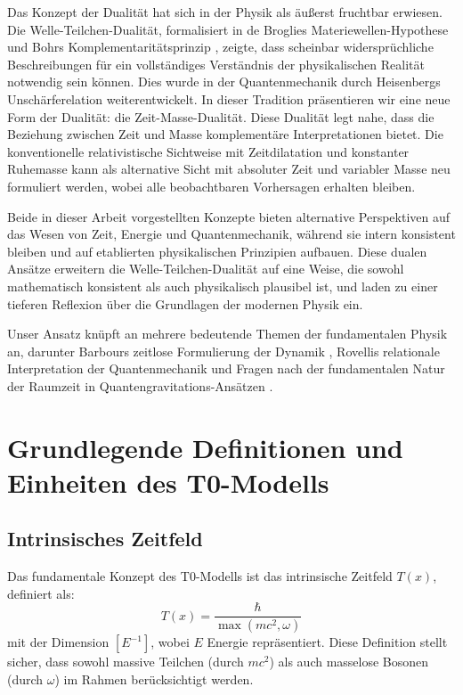 \documentclass[a4paper,12pt]{article}
\newcommand{\Tfield}{T(x)}
\begin{document}
	Das Konzept der Dualität hat sich in der Physik als äußerst fruchtbar erwiesen. Die Welle-Teilchen-Dualität, formalisiert in de Broglies Materiewellen-Hypothese \cite{deBroglie1923} und Bohrs Komplementaritätsprinzip \cite{Bohr1928}, zeigte, dass scheinbar widersprüchliche Beschreibungen für ein vollständiges Verständnis der physikalischen Realität notwendig sein können. Dies wurde in der Quantenmechanik durch Heisenbergs Unschärferelation \cite{Heisenberg1927} weiterentwickelt. In dieser Tradition präsentieren wir eine neue Form der Dualität: die Zeit-Masse-Dualität. Diese Dualität legt nahe, dass die Beziehung zwischen Zeit und Masse komplementäre Interpretationen bietet. Die konventionelle relativistische Sichtweise mit Zeitdilatation und konstanter Ruhemasse kann als alternative Sicht mit absoluter Zeit und variabler Masse neu formuliert werden, wobei alle beobachtbaren Vorhersagen erhalten bleiben.
	
	Beide in dieser Arbeit vorgestellten Konzepte bieten alternative Perspektiven auf das Wesen von Zeit, Energie und Quantenmechanik, während sie intern konsistent bleiben und auf etablierten physikalischen Prinzipien aufbauen. Diese dualen Ansätze erweitern die Welle-Teilchen-Dualität auf eine Weise, die sowohl mathematisch konsistent als auch physikalisch plausibel ist, und laden zu einer tieferen Reflexion über die Grundlagen der modernen Physik ein.
	
	Unser Ansatz knüpft an mehrere bedeutende Themen der fundamentalen Physik an, darunter Barbours zeitlose Formulierung der Dynamik \cite{Barbour1994}, Rovellis relationale Interpretation der Quantenmechanik \cite{Rovelli1996} und Fragen nach der fundamentalen Natur der Raumzeit in Quantengravitations-Ansätzen \cite{Oriti2014}.
	
	\section{Grundlegende Definitionen und Einheiten des T0-Modells}
	
	\subsection{Intrinsisches Zeitfeld}
	Das fundamentale Konzept des T0-Modells ist das intrinsische Zeitfeld $\Tfield$, definiert als:
	\[
	\Tfield = \frac{\hbar}{\max(mc^2, \omega)}
	\]
	mit der Dimension $[E^{-1}]$, wobei $E$ Energie repräsentiert. Diese Definition stellt sicher, dass sowohl massive Teilchen (durch $mc^2$) als auch masselose Bosonen (durch $\omega$) im Rahmen berücksichtigt werden.
	
\end{document}
